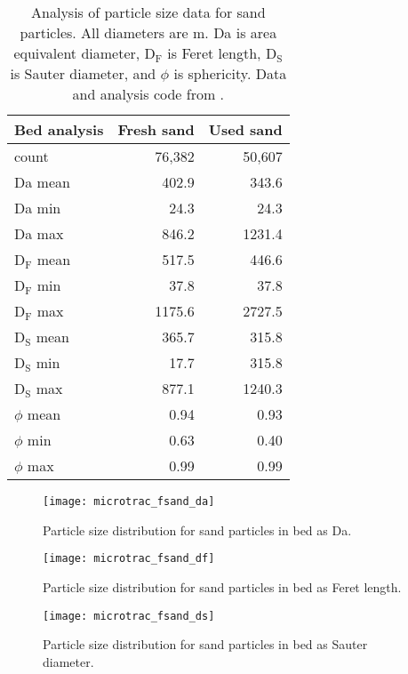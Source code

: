 \begin{table}[H]
    \centering
    \caption{Analysis of particle size data for sand particles. All diameters are \textmu m. Da is area equivalent diameter, D$_\textrm{F}$ is Feret length, D$_\textrm{S}$ is Sauter diameter, and $\phi$ is sphericity. Data and analysis code from \cite{Wiggins-2018}.}
    \label{tab:bed-analysis}
    \begin{tabular}{lrr}
        \toprule
        Bed analysis & Fresh sand & Used sand \\
        \midrule
        count & 76,382 & 50,607 \\
        \midrule
        Da mean & 402.9 & 343.6 \\
        Da min & 24.3 & 24.3 \\
        Da max & 846.2 & 1231.4 \\
        \midrule
        D$_\textrm{F}$ mean & 517.5 & 446.6 \\
        D$_\textrm{F}$ min & 37.8 & 37.8 \\
        D$_\textrm{F}$ max & 1175.6 & 2727.5 \\
        \midrule
        D$_\textrm{S}$ mean & 365.7 & 315.8 \\
        D$_\textrm{S}$ min & 17.7 & 315.8 \\
        D$_\textrm{S}$ max & 877.1 & 1240.3 \\
        \midrule
        $\phi$ mean & 0.94 & 0.93 \\
        $\phi$ min & 0.63 & 0.40 \\
        $\phi$ max & 0.99 & 0.99 \\
        \bottomrule
    \end{tabular}
\end{table}

\begin{figure}[H]
    \centering
    \texttt{[image: microtrac\_fsand\_da]}
    \caption{Particle size distribution for sand particles in bed as Da.}
    \label{fig:fsand-da}
\end{figure}

\begin{figure}[H]
    \centering
    \texttt{[image: microtrac\_fsand\_df]}
    \caption{Particle size distribution for sand particles in bed as Feret length.}
    \label{fig:fsand-df}
\end{figure}

\begin{figure}[H]
    \centering
    \texttt{[image: microtrac\_fsand\_ds]}
    \caption{Particle size distribution for sand particles in bed as Sauter diameter.}
    \label{fig:fsand-ds}
\end{figure}

